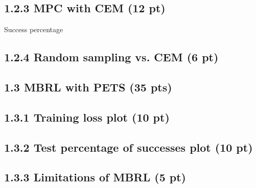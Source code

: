 \documentclass[12pt]{article}
\begin{document}
\subsection*{1.2.3 MPC with CEM (12 pt)}

Success percentage
\begin{tcolorbox}[fit,height=1cm, width=5cm, blank, borderline={1pt}{1pt},nobeforeafter]
\begin{center}
\end{center}
\end{tcolorbox}

\subsection*{1.2.4 Random sampling vs. CEM  (6 pt)}

\begin{tcolorbox}[fit,height=20em, width=40em, blank, borderline={1pt}{1pt},nobeforeafter]
\begin{center}
\end{center}
\end{tcolorbox}


\subsection*{1.3 MBRL with PETS (35 pts)}

\subsection*{1.3.1 Training loss plot (10 pt)}

\begin{tcolorbox}[fit,height=30em, width=40em, blank, borderline={1pt}{1pt},nobeforeafter]
\begin{center}
\end{center}
\end{tcolorbox}

\subsection*{1.3.2 Test percentage of successes plot (10 pt)}

\begin{tcolorbox}[fit,height=30em, width=40em, blank, borderline={1pt}{1pt},nobeforeafter]
\begin{center}
\end{center}
\end{tcolorbox}

\subsection*{1.3.3 Limitations of MBRL (5 pt)}

\begin{tcolorbox}[fit,height=20em, width=40em, blank, borderline={1pt}{1pt},nobeforeafter]
\begin{center}
\end{center}
\end{tcolorbox}
\end{document}
